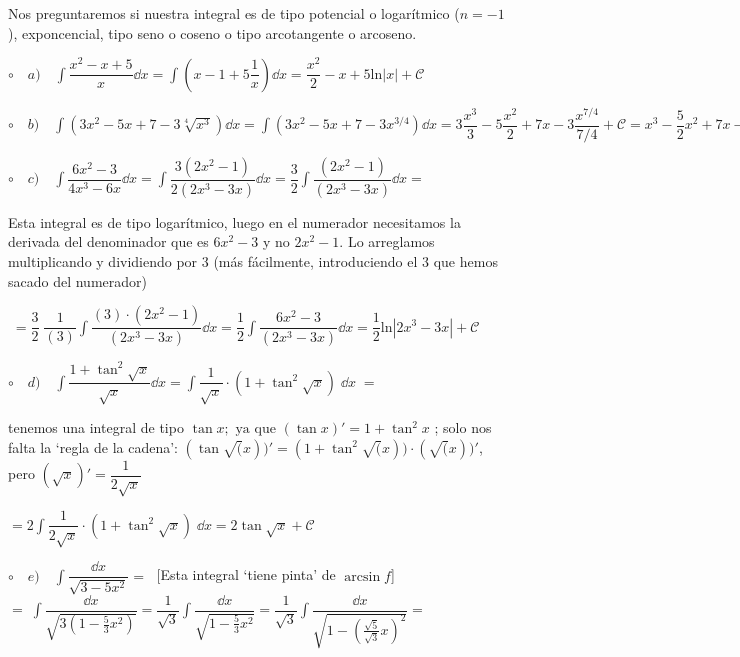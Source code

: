 \begin{proofw}\renewcommand{\qedsymbol}{$\diamond$}	
Nos preguntaremos si nuestra integral es de tipo potencial o logarítmico ($n=-1$), exponcencial, tipo seno o coseno o tipo arcotangente o arcoseno. 

	$\circ \quad  a) \quad \displaystyle \int \dfrac {x^2-x+5}{x} \dd x= \displaystyle \int \left( x - 1 + 5 \dfrac 1 x  \right) \dd x= \dfrac {x^2}{2} - x +5 \mathrm{ln} |x|+ \mathcal C$
	
	$\circ \quad b) \quad \displaystyle \int (3x^2-5x+7-3\sqrt[4]{x^3}) \dd x= \displaystyle \int  (3x^2-5x+7-3x^{3/4}) \dd x= 3 \dfrac {x^3}{3} - 5 \dfrac {x^2}{2} +7x - 3 \dfrac {x^{7/4}}{7/4}+\mathcal C= x^3 -\dfrac 5 2 x^2 +7x - \dfrac {12}{7} \sqrt[4]{x^7}+\mathcal C $
	
	$\circ  \quad c) \quad \displaystyle \int \dfrac {6x^2-3}{4x^3-6x} \dd x= \displaystyle \int \dfrac {3(2x^2-1)}{2(2x^3-3x)} \dd x= \displaystyle \dfrac 3 2 \int \dfrac {(2x^2-1)}{(2x^3-3x)} \dd x =\; $ 
	
	\small{Esta integral es de tipo logarítmico, luego en el numerador necesitamos la derivada del denominador que es $6x^2-3$ y no $2x^2-1$. Lo arreglamos multiplicando y dividiendo por $3$ (más fácilmente, introduciendo el $3$ que hemos sacado del numerador)} 
	
	$\; =\displaystyle \dfrac 3 2 \; \dfrac 1 {(3)} \int \dfrac {(3)\cdot (2x^2-1)}{(2x^3-3x)} \dd x= \displaystyle  \dfrac 1 2 \int \dfrac {6x^2-3}{(2x^3-3x)} \dd x= \dfrac 1 2 \mathrm{ln} |2x^3-3x| + \mathcal C$
	
	$\circ \quad d) \quad \displaystyle \int \dfrac {1 + \tan^2 \sqrt{x}}{\sqrt{x}} \dd x = \displaystyle \int  \dfrac {1} {\sqrt{x}} \cdot (1 + \tan^2 \sqrt{x}) \;  \dd x\; = $ 
	
	\small{ tenemos una integral de tipo $\tan x; \mbox{ ya que } (\tan x)'=1+\tan^2 x	$ ; solo nos falta la `regla de la cadena': $(\tan \sqrt(x))' = (1+\tan^2 \sqrt(x))\cdot (\sqrt(x))'$, pero $( \sqrt{x} )'=\dfrac {1}{2 \sqrt{x}}\; $ }
	
	$= \displaystyle 2 \int  \dfrac {1} {2\sqrt{x}} \cdot (1 + \tan^2 \sqrt{x}) \;  \dd x= 2 \tan \sqrt x + \mathcal C$ 
	
	$\circ \quad e) \quad \displaystyle \int \dfrac {\dd x}{\sqrt{3-5x^2}}=\;$ [Esta integral `tiene pinta' de $\arcsin f$]  $=\; \displaystyle \int \dfrac {\dd x}{\sqrt{3(1-\frac 5 3 x^2)}}= \dfrac {1}{\sqrt{3}} \displaystyle \int \dfrac {\dd x}{\sqrt{1-\frac 5 3 x^2}}= \dfrac {1}{\sqrt{3}} \displaystyle \int \dfrac {\dd x}{ \sqrt {1- \left( \frac {\sqrt 5} {\sqrt 3} x \right)^2} } = $ 
	

\end{proofw}
